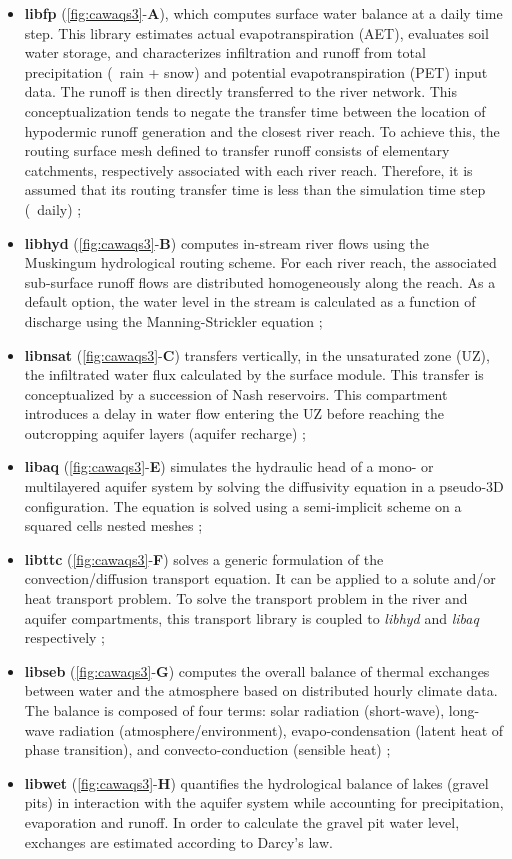 \begin{itemize}
    \item \textbf{libfp} (\cref{fig:cawaqs3}-\textbf{A}), which computes surface water balance at a daily time step. This library estimates actual evapotranspiration (AET), evaluates soil water storage, and characterizes infiltration and runoff from total precipitation (\ie\ rain + snow) and potential evapotranspiration (PET) input data. The runoff is then directly transferred to the river network. This conceptualization tends to negate the transfer time between the location of hypodermic runoff generation and the closest river reach. To achieve this, the routing surface mesh defined to transfer runoff consists of elementary catchments, respectively associated with each river reach. Therefore, it is assumed that its routing transfer time is less than the simulation time step (\ie~daily) ;
    \item \textbf{libhyd} (\cref{fig:cawaqs3}-\textbf{B}) computes in-stream river flows using the Muskingum hydrological routing scheme. For each river reach, the associated sub-surface runoff flows are distributed homogeneously along the reach. As a default option, the water level in the stream is calculated as a function of discharge using the Manning-Strickler equation ;
    \item \textbf{libnsat} (\cref{fig:cawaqs3}-\textbf{C}) transfers vertically, in the unsaturated zone (UZ), the infiltrated water flux calculated by the surface module. This transfer is conceptualized by a succession of Nash reservoirs. This compartment introduces a delay in water flow entering the UZ before reaching the outcropping aquifer layers (aquifer recharge) ;
    \item \textbf{libaq} (\cref{fig:cawaqs3}-\textbf{E}) simulates the hydraulic head of a mono- or multilayered aquifer system by solving the diffusivity equation in a pseudo-3D configuration. The equation is solved using a semi-implicit scheme on a squared cells nested meshes ;
    \item \textbf{libttc} (\cref{fig:cawaqs3}-\textbf{F}) solves a generic formulation of the convection/diffusion transport equation. It can be applied to a solute and/or heat transport problem. To solve the transport problem in the river and aquifer compartments, this transport library is coupled to \textit{libhyd} and \textit{libaq} respectively ; 
    \item \textbf{libseb} (\cref{fig:cawaqs3}-\textbf{G}) computes the overall balance of thermal exchanges between water and the atmosphere based on distributed hourly climate data. The balance is composed of four terms: solar radiation (short-wave), long-wave radiation (atmosphere/environment), evapo-condensation (latent heat of phase transition), and convecto-conduction (sensible heat) ;
    \item \textbf{libwet} (\cref{fig:cawaqs3}-\textbf{H}) quantifies the  hydrological balance of lakes (gravel pits) in interaction with the aquifer system while accounting for precipitation, evaporation and runoff. In order to calculate the gravel pit water level, exchanges are estimated according to Darcy's law.
\end{itemize}

